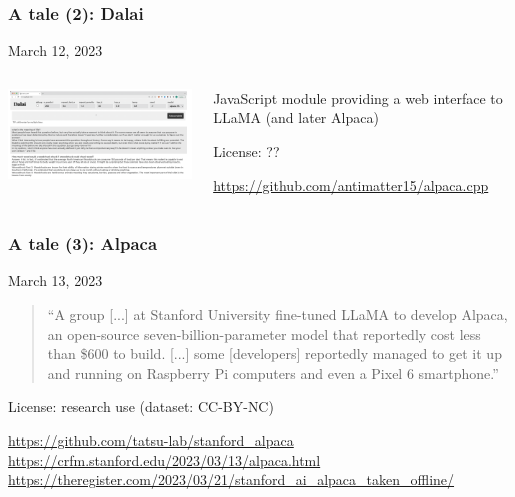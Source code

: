 \documentclass[17pt,aspectratio=169,hyperref={pdfusetitle,colorlinks,allcolors=olive}]{beamer}
\begin{document}
\begin{frame}[fragile]
  \frametitle{A tale (2): Dalai}

  March 12, 2023
  
  \begin{columns}[T]
    \begin{column}{.58\textwidth}
      \includegraphics[width=7.5cm]{figs/dalai}
    \end{column}%
    \hfill%
    \begin{column}{.38\textwidth}
      \vspace{1.5cm}

      
      JavaScript module providing a web interface to LLaMA (and later Alpaca)

      License: ??
      
      {\scriptsize
        \url{https://github.com/antimatter15/alpaca.cpp}
      }
    \end{column}%
  \end{columns}


\end{frame}

\begin{frame}[fragile]
  \frametitle{A tale (3): Alpaca}

  March 13, 2023
  
  \begin{quote}
    \footnotesize ``A group [...] at Stanford University fine-tuned LLaMA to develop Alpaca, an open-source seven-billion-parameter model that reportedly cost less than \$600 to build. [...] some [developers] reportedly managed to get it up and running on Raspberry Pi computers and even a Pixel 6 smartphone.''
  \end{quote}

  License: research use (dataset: CC-BY-NC)
  
  \begin{flushright}
    {\scriptsize
      \url{https://github.com/tatsu-lab/stanford_alpaca} \\
      \url{https://crfm.stanford.edu/2023/03/13/alpaca.html} \\
      \url{https://theregister.com/2023/03/21/stanford_ai_alpaca_taken_offline/} \\
    }
  \end{flushright}
\end{frame}
\end{document}
